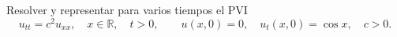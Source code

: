 Resolver y representar para varios tiempos el PVI
\[u_{tt}=c^2u_{xx},\quad x\in\mathbb R,\quad t>0,\qquad
u(x,0)=0,\quad u_t(x,0)=\cos x,\quad c>0.\]
